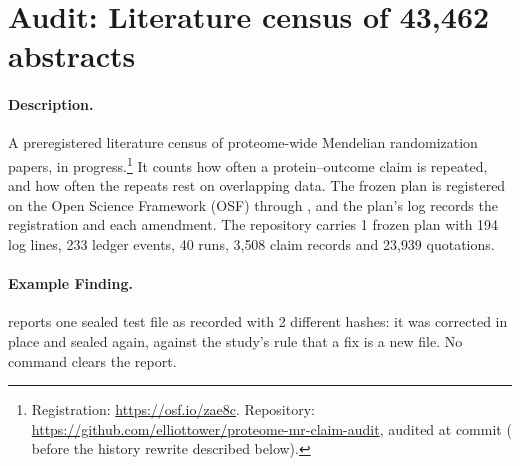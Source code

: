 
\section{Audit: Literature census of 43{,}462 abstracts}
\label{sec:census}

\paragraph{Description.} A preregistered literature census of proteome-wide Mendelian randomization
papers, in progress.\footnote{Registration: \url{https://osf.io/zae8c}. Repository: \url{https://github.com/elliottower/proteome-mr-claim-audit}, audited at commit  ( before the history rewrite described below).}
It counts how often a protein--outcome claim is repeated, and how often the repeats rest on
overlapping data. The frozen plan is registered on the Open Science Framework (OSF) through
, and the plan's log records the registration and each amendment.
The repository carries 1 frozen plan with 194 log lines, 233
ledger events, 40 runs, 3{,}508 claim records and 23{,}939 quotations.

\paragraph{Example Finding.}  reports one sealed test file as recorded
with 2 different hashes: it was corrected in place and sealed again, against the study's rule that
a fix is a new file. No command clears the report.


